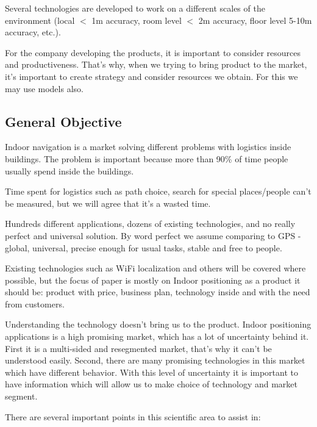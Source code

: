 Several technologies are developed to work on a different scales of the environment (local $<$ 1m accuracy, room level $<$ 2m accuracy, floor level 5-10m accuracy, etc.).

For the company developing the products, it is important to consider resources and productiveness. That's why, when we trying to bring product to the market, it's important to create strategy and consider resources we obtain. For this we may use models also.


\subsection{General Objective}


%
Indoor navigation is a market solving different problems with logistics inside buildings. The problem is important because more than 90\% of time people usually spend inside the buildings\cite{Indoor_Generation}.

Time spent for logistics such as path choice, search for special places/people can't be measured, but we will agree that it's a wasted time.

Hundreds different applications, dozens of existing technologies, and no really perfect and universal solution. By word perfect we assume comparing to GPS - global, universal, precise enough for usual tasks, stable and free to people.

Existing technologies such as WiFi localization and others will be covered where possible, but the focus of paper is mostly on Indoor positioning as a product it should be: product with price, business plan, technology inside and with the need from customers.

Understanding the technology doesn't bring us to the product.
Indoor positioning applications is a high promising market, which has a lot of uncertainty behind it. First it is a multi-sided and resegmented market, that's why it can't be understood easily. Second, there are many promising technologies in this market which have different behavior. With this level of uncertainty it is important to have information which will allow us to make choice of technology and market segment.

There are several important points in this scientific area to assist in:


